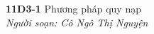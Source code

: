 \documentclass[12pt,a4paper]{article}
\begin{document}
	\begin{center}
		\textbf{11D3-1} Phương pháp quy nạp\\
		\textit{Người soạn: Cô Ngô Thị Nguyện }
	\end{center}
\end{document}
